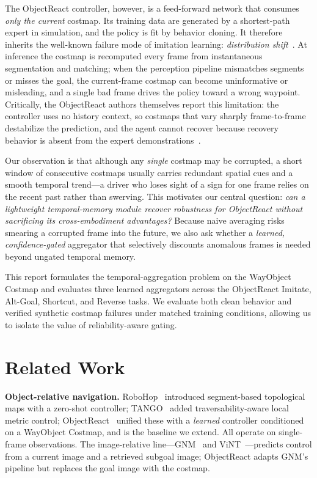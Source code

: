 \documentclass[conference]{IEEEtran}
\begin{document}
The ObjectReact controller, however, is a feed-forward network that consumes \emph{only the current} costmap. Its training data are generated by a shortest-path expert in simulation, and the policy is fit by behavior cloning. It therefore inherits the well-known failure mode of imitation learning: \emph{distribution shift}~\cite{ross2011dagger}. At inference the costmap is recomputed every frame from instantaneous segmentation and matching; when the perception pipeline mismatches segments or misses the goal, the current-frame costmap can become uninformative or misleading, and a single bad frame drives the policy toward a wrong waypoint. Critically, the ObjectReact authors themselves report this limitation: the controller uses no history context, so costmaps that vary sharply frame-to-frame destabilize the prediction, and the agent cannot recover because recovery behavior is absent from the expert demonstrations~\cite{garg2025objectreact}.

Our observation is that although any \emph{single} costmap may be corrupted, a short window of consecutive costmaps usually carries redundant spatial cues and a smooth temporal trend---a driver who loses sight of a sign for one frame relies on the recent past rather than swerving. This motivates our central question: \emph{can a lightweight temporal-memory module recover robustness for ObjectReact without sacrificing its cross-embodiment advantages?} Because naive averaging risks smearing a corrupted frame into the future, we also ask whether a \emph{learned, confidence-gated} aggregator that selectively discounts anomalous frames is needed beyond ungated temporal memory.

This report formulates the temporal-aggregation problem on the WayObject Costmap and evaluates three learned aggregators across the ObjectReact Imitate, Alt-Goal, Shortcut, and Reverse tasks. We evaluate both clean behavior and verified synthetic costmap failures under matched training conditions, allowing us to isolate the value of reliability-aware gating.

\section{Related Work}

\textbf{Object-relative navigation.} RoboHop~\cite{garg2024robohop} introduced segment-based topological maps with a zero-shot controller; TANGO~\cite{podgorski2025tango} added traversability-aware local metric control; ObjectReact~\cite{garg2025objectreact} unified these with a \emph{learned} controller conditioned on a WayObject Costmap, and is the baseline we extend. All operate on single-frame observations. The image-relative line---GNM~\cite{shah2023gnm} and ViNT~\cite{shah2023vint}---predicts control from a current image and a retrieved subgoal image; ObjectReact adapts GNM's pipeline but replaces the goal image with the costmap.
\end{document}
